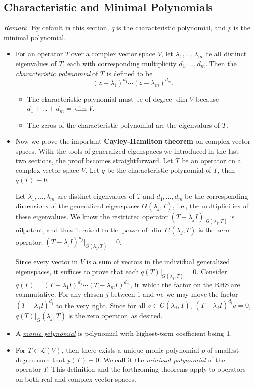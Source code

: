 \documentclass[11pt]{article}
\newcommand{\df}[1]{\ul{\textit{\textsf{#1}}}}
\renewcommand{\d}{\dim}
\newcommand{\LV}{\mathcal{L}(V)}
\begin{document}
\subsection{Characteristic and Minimal Polynomials}
\textit{Remark.} By default in this section, $q$ is the characteristic polynomial, and $p$ is the minimal polynomial.
\begin{itemize}
    \item For an operator $T$ over a complex vector space $V$, let $\lambda_1, \dots, \lambda_m$ be all distinct eigenvalues of $T$, each with corresponding multiplicity $d_1,\dots, d_m$. Then the \df{characteristic polynomial} of $T$ is defined to be \[(z-\lambda_1)^{d_1}\cdots (z-\lambda_m)^{d_m}.\]
    \begin{itemize}
        \item The characteristic polynomial must be of degree $\d V$ because $d_1+\dots+d_m = \d V$.
        \item The zeros of the characteristic polynomial are the eigenvalues of $T$.
    \end{itemize}
    \item Now we prove the important \textbf{Cayley-Hamilton theorem} on complex vector spaces. With the tools of generalized eigenspaces we introduced in the last two sections, the proof becomes straightforward. Let $T$ be an operator on a complex vector space $V$. Let $q$ be the characteristic polynomial of $T$, then $q(T) = 0$.

    Let $\lambda_1,\dots,\lambda_m$ are distinct eigenvalues of $T$ and $d_1,\dots,d_m$ be the corresponding dimensions of the generalized eigenspaces $G(\lambda_j,T)$, i.e., the multiplicities of these eigenvalues. We know the restricted operator $(T - \lambda_j I)|_{G(\lambda_j,T)}$ is nilpotent, and thus it raised to the power of $\d G(\lambda_j,T)$ is the zero operator: $(T - \lambda_j I)^{d_j}|_{G(\lambda_j,T)} = 0$.

    Since every vector in $V$ is a sum of vectors in the individual generalized eigenspaces, it suffices to prove that each $q(T)|_{G(\lambda_j,T)} = 0$. Consider $q(T) = (T - \lambda_1 I)^{d_1} \cdots (T - \lambda_m I)^{d_m}$, in which the factor on the RHS are commutative. For any chosen $j$ between 1 and $m$, we may move the factor $(T - \lambda_j I)^{d_j}$ to the very right. Since for all $v \in G(\lambda_j,T)$, $(T - \lambda_j I)^{d_j}v = 0$, $q(T)|_G(\lambda_j,T)$ is the zero operator, as desired.

    \item A \df{monic polynomial} is polynomial with highest-term coefficient being 1.
    \item For $T \in \LV$, then there exists a unique monic polynomial $p$ of smallest degree such that $p(T)=0$. We call it the \df{minimal polynomial} of the operator $T$. This definition and the forthcoming theorems apply to operators on both real and complex vector spaces.
    

\end{itemize}
\end{document}
